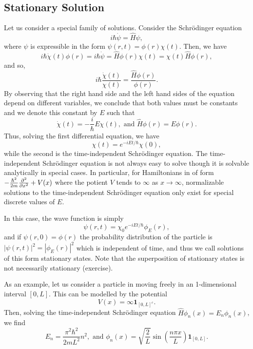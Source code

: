 \documentclass[]{article}
\theoremstyle{definition}
\theoremstyle{definition}
\begin{document}
\subsection{Stationary Solution}

Let us consider a special family of solutions. Consider the Schrödinger equation 
\[i\hbar \dot \psi = \hat H \psi,\]
where \(\psi\) is expressible in the form \(\psi(r, t) = \phi(r)\chi(t)\). Then,
we have 
\[i\hbar \dot \chi(t) \phi(r) = 
  i\hbar \dot \psi = 
  \hat H \phi(r) \chi(t) = \chi(t) \hat H \phi(r),\]
and so,
\[i\hbar \frac{\dot \chi(t)}{\chi(t)} = \frac{\hat H \phi(r)}{\phi(r)}.\]
By observing that the right hand side and the left hand sides of the equation 
depend on different variables, we conclude that both values must be constants 
and we denote this constant by \(E\) such that 
\[\dot \chi(t) = - \frac{i}{\hbar}E \chi(t), \text{ and } 
  \hat H \phi(r) = E \phi(r).\]
Thus, solving the first differential equation, we have 
\[\chi(t) = e^{-iEt / \hbar}\chi(0),\]
while the second is the time-independent Schrödinger equation.
The time-independent Schrödinger equation is not always easy to solve though 
it is solvable analytically in special cases. In particular, for Hamiltonians 
in of form \(- \frac{\hbar^2}{2m} \pdv[2]{x} + V(x)\) where the potient \(V\) 
tends to \(\infty\) as \(x \to \infty\), normalizable solutions to the 
time-independent Schrödinger equation only exist for special discrete 
values of \(E\).

In this case, the wave function is simply 
\[\psi(r, t) = \chi_0 e^{-iEt/ \hbar} \phi_E(r),\]
and if \(\psi(r, 0) = \phi(r)\) the probability distribution of the particle is
\(|\psi(r, t)|^2 = |\phi_E(r)|^2\) which is independent of time, and thus 
we call solutions of this form stationary states. Note that the superposition 
of stationary states is not necessarily stationary (exercise).

As an example, let us consider a particle in moving freely in an 1-dimensional 
interval \([0, L]\). This can be modelled by the potential 
\[V(x) = \infty \mathbf{1}_{[0, L]^c}.\]
Then, solving the time-independent Schrödinger equation 
\(\hat H \phi_n(x) = E_n \phi_n(x)\), we find 
\[E_n = \frac{\pi^2 \hbar^2}{2mL^2} n^2, \text{ and } 
  \phi_n(x) = \sqrt{\frac{2}{L}} \sin \left(\frac{n\pi x}{L}\right) 
  \mathbf{1}_{[0, L]}.\]
\end{document}
